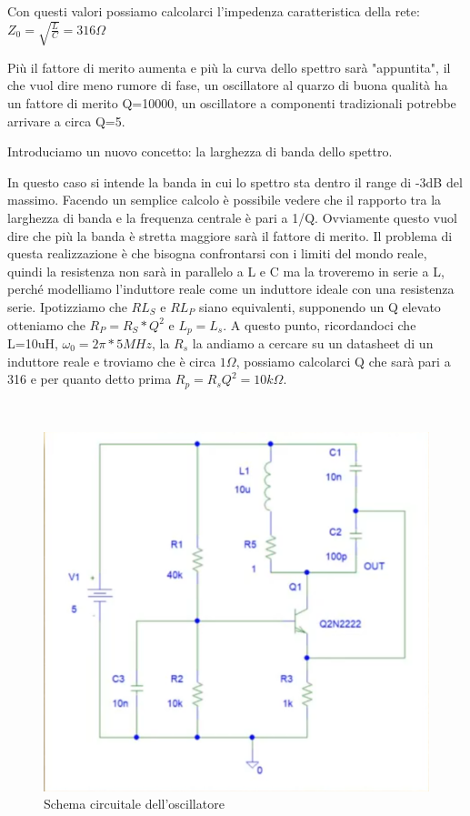 \documentclass{article}
\begin{document}
Con questi valori possiamo calcolarci l'impedenza caratteristica della rete:
$Z_0=\sqrt{\frac{L}{C}}=316\Omega$
\centering

Più il fattore di merito aumenta e più la curva dello spettro sarà "appuntita", il che vuol dire meno rumore di fase, un oscillatore al quarzo di buona qualità ha un fattore di merito Q=10000, un oscillatore a componenti tradizionali potrebbe arrivare a circa Q=5.

Introduciamo un nuovo concetto: la larghezza di banda dello spettro.

In questo caso si intende la banda in cui lo spettro sta dentro il range di -3dB del massimo.
Facendo un semplice calcolo è possibile vedere che il rapporto tra la larghezza di banda e la frequenza centrale è pari a 1/Q.
Ovviamente questo vuol dire che più la banda è stretta maggiore sarà il fattore di merito.
Il problema di questa realizzazione è che bisogna confrontarsi con i limiti del mondo reale, quindi la resistenza non sarà in parallelo a L e C ma la troveremo in serie a L, perché modelliamo l'induttore reale come un induttore ideale con una resistenza serie.
Ipotizziamo che $RL_S$ e $RL_P$ siano equivalenti, supponendo un Q elevato otteniamo che $R_P=R_S*Q^2$  e $L_p=L_s$.
A questo punto, ricordandoci che L=10uH, $\omega_0=2\pi * 5MHz$, la $R_s$ la andiamo a cercare su un datasheet di un induttore reale e troviamo che è circa $1\Omega$, possiamo calcolarci Q che sarà pari a 316 e per quanto detto prima $R_p=R_sQ^2=10k\Omega$.


~\begin{figure}[H]
\includegraphics[scale=0.5]{Oscillatore.png}
\centering
\caption{Schema circuitale dell'oscillatore}
\label{fig:foo}
\end{figure}
\end{document}
